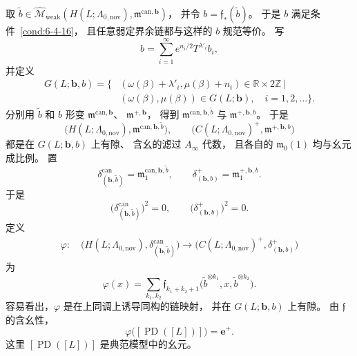 取
$\widetilde b\in
\widehat{\mathcal M}_{\mathrm{weak}}
(H(L;\Lambda_{0,\mathrm{nov}}),
\mathfrak m^{\mathrm{can},\boldsymbol b})$，
并令 $b=\mathfrak f_*(\widetilde b)$。
于是 $b$ 满足条件~\ref{cond:6-4-16}，
且任意弱定界余链都与这样的 $b$ 规范等价。
写
\begin{equation}
b=\sum_{i=1}^{\infty}
e^{n_i/2}T^{\lambda'_i}b_i,
\tag{6.4.20}\label{eq:6-4-20}
\end{equation}
并定义
\begin{equation}
\begin{aligned}
G(L;\boldsymbol b,b)
=\bigl\{&
(\omega(\beta)+\lambda'_i,
\mu(\beta)+n_i)
\in\mathbb R\times2\mathbb Z\ \big|\\
&(\omega(\beta),\mu(\beta))
\in G(L;\boldsymbol b),\quad i=1,2,\ldots
\bigr\}.
\end{aligned}
\tag{6.4.21}\label{eq:6-4-21}
\end{equation}
分别用 $\widetilde b$ 和 $b$
形变 $\mathfrak m^{\mathrm{can},\boldsymbol b}$、
$\mathfrak m^{+,\boldsymbol b}$，
得到 $\mathfrak m^{\mathrm{can},\boldsymbol b,\widetilde b}$
与 $\mathfrak m^{+,\boldsymbol b,b}$。
于是
\[
\bigl(H(L;\Lambda_{0,\mathrm{nov}}),
\mathfrak m^{\mathrm{can},\boldsymbol b,\widetilde b}\bigr),
\qquad
\bigl(C(L;\Lambda_{0,\mathrm{nov}})^+,
\mathfrak m^{+,\boldsymbol b,b}\bigr)
\]
都是在 $G(L;\boldsymbol b,b)$ 上有隙、
含幺的滤过 $A_\infty$ 代数，
且各自的 $\mathfrak m_0(1)$
均与幺元成比例。
置
\[
\delta^{\mathrm{can}}_{(\boldsymbol b,\widetilde b)}
=\mathfrak m_1^{\mathrm{can},\boldsymbol b,\widetilde b},
\qquad
\delta^+_{(\boldsymbol b,b)}
=\mathfrak m_1^{+,\boldsymbol b,b}.
\]
于是
\[
\bigl(\delta^{\mathrm{can}}_{(\boldsymbol b,\widetilde b)}\bigr)^2=0,
\qquad
\bigl(\delta^+_{(\boldsymbol b,b)}\bigr)^2=0.
\]
定义
\[
\begin{aligned}
\varphi:\quad
\bigl(H(L;\Lambda_{0,\mathrm{nov}}),
\delta^{\mathrm{can}}_{(\boldsymbol b,\widetilde b)}\bigr)
\longrightarrow
\bigl(C(L;\Lambda_{0,\mathrm{nov}})^+,
\delta^+_{(\boldsymbol b,b)}\bigr)
\end{aligned}
\]
为
\[
\varphi(x)
=\sum_{k_1,k_2}
\mathfrak f_{k_1+k_2+1}
\bigl(\widetilde b^{\otimes k_1},
x,\widetilde b^{\otimes k_2}\bigr).
\]
容易看出，$\varphi$ 是在上同调上诱导同构的链映射，
并在 $G(L;\boldsymbol b,b)$ 上有隙。
由 $\mathfrak f$ 的含幺性，
\begin{equation}
\varphi\bigl([\operatorname{PD}([L])]\bigr)
=\mathbf e^+.
\tag{6.4.22}\label{eq:6-4-22}
\end{equation}
这里 $[\operatorname{PD}([L])]$
是典范模型中的幺元。

